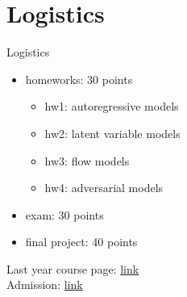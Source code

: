 

\begin{frame}
\titlepage
\end{frame}
\section{Logistics}
\begin{frame}{Logistics}
    \begin{itemize}
        \item homeworks: 30 points
        \begin{itemize}
            \item hw1: autoregressive models
            \item hw2: latent variable models
            \item hw3: flow models
            \item hw4: adversarial models
        \end{itemize}
        \item exam: 30 points
        \item final project: 40 points
    \end{itemize}
    Last year course page: \href{http://bit.ly/IS_B2}{link} \\
    Admission: \href{https://docs.google.com/spreadsheets/d/1FpTneCfkYNIG1FMxG7ALTwMCGDngkqc_OJC6SDqeG0Q/edit?usp=sharing}{link}
\end{frame}
